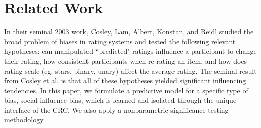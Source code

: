 \section{Related Work}


In their seminal 2003 work, Cosley, Lam, Albert, Konstan, and Reidl \cite{cosley2003seeing} studied the broad problem of biases in rating systems and tested the following relevant hypotheses:  can manipulated ``predicted" ratings influence a participant to change their rating, how consistent participants when re-rating an item, and how does rating scale (eg. stars, binary, unary) affect the average rating. 
The seminal result from Cosley et al. is that all of these hypotheses yielded significant influencing tendencies.
In this paper, we formulate a predictive model for a specific type of bias, social influence bias, which is learned and isolated through the unique interface of the CRC. 
We also apply a nonparametric significance testing methodology.

